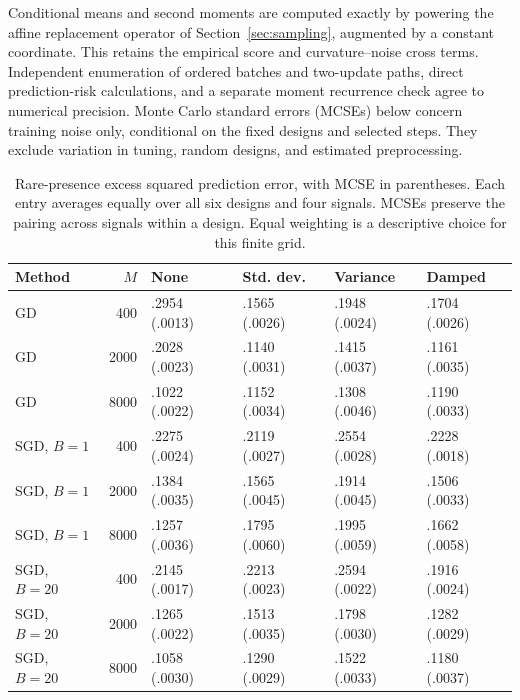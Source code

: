 Conditional means and second moments are computed exactly by powering the affine
replacement operator of Section~\ref{sec:sampling}, augmented by a constant
coordinate. This retains the empirical score and curvature--noise cross terms.
Independent enumeration of ordered batches and two-update paths, direct
prediction-risk calculations, and a separate moment recurrence check agree to
numerical precision. Monte Carlo standard errors (MCSEs) below concern training
noise only, conditional on the fixed designs and selected steps. They exclude
variation in tuning, random designs, and estimated preprocessing.

\begin{table}[t]
 \centering
 \small
 \setlength{\tabcolsep}{4pt}
 \begin{tabular}{lrllll}
  \toprule
  Method        &  $M$ & None          & Std. dev.     & Variance      & Damped        \\
  \midrule
  GD            &  400 & .2954 (.0013) & .1565 (.0026) & .1948 (.0024) & .1704 (.0026) \\
  GD            & 2000 & .2028 (.0023) & .1140 (.0031) & .1415 (.0037) & .1161 (.0035) \\
  GD            & 8000 & .1022 (.0022) & .1152 (.0034) & .1308 (.0046) & .1190 (.0033) \\
  SGD, $B = 1$  &  400 & .2275 (.0024) & .2119 (.0027) & .2554 (.0028) & .2228 (.0018) \\
  SGD, $B = 1$  & 2000 & .1384 (.0035) & .1565 (.0045) & .1914 (.0045) & .1506 (.0033) \\
  SGD, $B = 1$  & 8000 & .1257 (.0036) & .1795 (.0060) & .1995 (.0059) & .1662 (.0058) \\
  SGD, $B = 20$ &  400 & .2145 (.0017) & .2213 (.0023) & .2594 (.0022) & .1916 (.0024) \\
  SGD, $B = 20$ & 2000 & .1265 (.0022) & .1513 (.0035) & .1798 (.0030) & .1282 (.0029) \\
  SGD, $B = 20$ & 8000 & .1058 (.0030) & .1290 (.0029) & .1522 (.0033) & .1180 (.0037) \\
  \bottomrule
 \end{tabular}
 \caption{
  Rare-presence excess squared prediction error, with MCSE in parentheses. Each
  entry averages equally over all six designs and four signals. MCSEs preserve
  the pairing across signals within a design. Equal weighting is a descriptive
  choice for this finite grid.
 }
 \label{tab:pilot}
\end{table}

